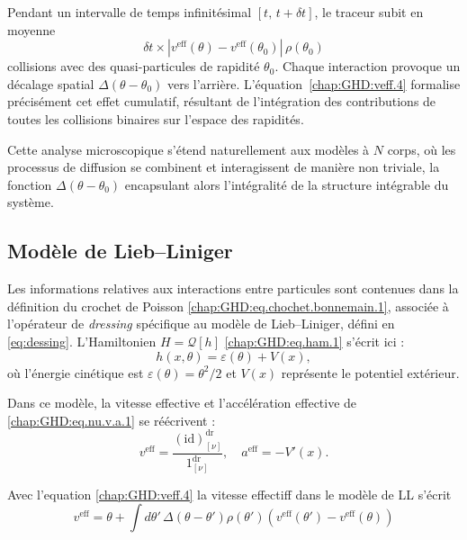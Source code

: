 Pendant un intervalle de temps infinitésimal \([t,\, t + \delta t]\), le traceur subit en moyenne
\[
\delta t \times \left| v^{\mathrm{eff}}(\theta) - v^{\mathrm{eff}}(\theta_0) \right| \, \rho(\theta_0)
\]
collisions avec des quasi-particules de rapidité \(\theta_0\). Chaque interaction provoque un décalage spatial \(\Delta(\theta - \theta_0)\) vers l’arrière. L’équation~\eqref{chap:GHD:veff.4} formalise précisément cet effet cumulatif, résultant de l’intégration des contributions de toutes les collisions binaires sur l’espace des rapidités.

Cette analyse microscopique s’étend naturellement aux modèles à \(N\) corps, où les processus de diffusion se combinent et interagissent de manière non triviale, la fonction \(\Delta(\theta - \theta_0)\) encapsulant alors l’intégralité de la structure intégrable du système.

\subsection{Modèle de Lieb–Liniger}

Les informations relatives aux interactions entre particules sont contenues dans la définition du crochet de Poisson \eqref{chap:GHD:eq.chochet.bonnemain.1}, associée à l’opérateur de \emph{dressing} spécifique au modèle de Lieb–Liniger, défini en \eqref{eq:dessing}.  
L’Hamiltonien $H = \mathcal{Q}[h]$ \eqref{chap:GHD:eq.ham.1} s’écrit ici :
\begin{equation}\label{chap:GHD:eq.ham.2}
	h(x , \theta ) = \varepsilon(\theta) + V(x),
\end{equation}
où l’énergie cinétique est $\varepsilon(\theta) = \theta^2 / 2$ et $V(x)$ représente le potentiel extérieur.

\medskip

Dans ce modèle, la vitesse effective et l’accélération effective de \eqref{chap:GHD:eq.nu.v.a.1} se réécrivent :
\begin{equation}
	v^{\mathrm{eff}} = \frac{(\mathrm{id})^{\mathrm{dr}}_{[\nu]}}{1^{\mathrm{dr}}_{[\nu]}}, 
	\quad a^{\mathrm{eff}} = - V'(x).
\end{equation}

Avec l'equation \eqref{chap:GHD:veff.4} la vitesse effectiff dans le modèle de LL s'écrit 
\begin{equation}
	v^{\mathrm{eff}} = \theta +	\int d \theta' \, \Delta(\theta - \theta') \rho ( \theta') ( v^{\mathrm{eff}} ( \theta' ) - v^{\mathrm{eff}} ( \theta )  ) 
\end{equation}


